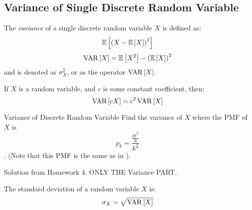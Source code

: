 \subsection{Variance of Single Discrete Random Variable}\label{subsec:Variance of Single Discrete}
\begin{definition}[Variance]\label{def:Variance of Single Discrete}
  The \emph{variance} of a single discrete random variable $X$ is defined as:
  \begin{equation}\label{eq:Variance of Single Discrete-Form 1}
    \operatorname{\operatorname{\mathbb{E}}} \left[ \left( X - \operatorname{\operatorname{\mathbb{E}}} \left[ X \right] \right)^{2} \right]
  \end{equation}
  \begin{equation}\label{eq:Variance of Single Discrete-Form 2}
    \operatorname{\operatorname{VAR}} \left[ X \right] = \operatorname{\operatorname{\mathbb{E}}} \left[ X^{2} \right] - \left( \operatorname{\operatorname{\mathbb{E}}} \left[ X \right] \right)^{2}
  \end{equation}
  and is denoted as $\sigma_{X}^{2}$, or as the operator $\operatorname{\operatorname{VAR}} \left[ X \right]$.
  \begin{remark}\label{rmk:Constant in Variance}
    If $X$ is a random variable, and $c$ is some constant coefficient, then:
    \begin{equation}
      \operatorname{\operatorname{VAR}} \left[ cX \right] = c^{2} \operatorname{\operatorname{VAR}} \left[ X \right]
    \end{equation}
  \end{remark}
\end{definition}
\begin{example}[Problem 3.27]{Variance of Discrete Random Variable}
  Find the variance of $X$ where the PMF of $X$ is \[p_{k} = \frac{\frac{pi^{2}}{6}}{k^{2}}\]. (Note that this PMF is the same as in ).

  \tcblower

  Solution from Homework 4. ONLY THE Variance PART.
\end{example}
\begin{definition}\label{def:Standard Deviation}
  The standard deviation of a random variable $X$ is:
  \begin{equation}\label{eq:Standard Deviation}
    \sigma_{X} = \sqrt{\operatorname{\operatorname{VAR}} \left[ X \right]}
  \end{equation}
\end{definition}

